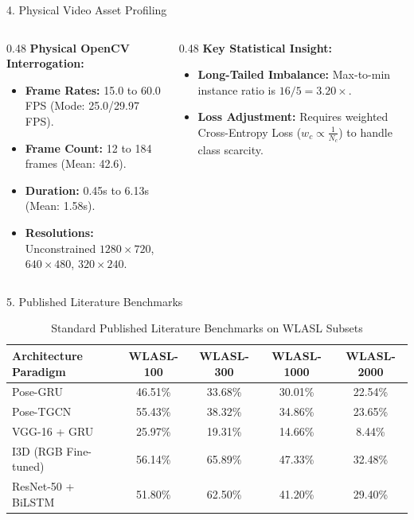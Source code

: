 \documentclass[aspectratio=169, 10pt]{beamer}
\begin{document}
\begin{frame}{4. Physical Video Asset Profiling}
  \begin{columns}[T]
    \begin{column}{0.48\textwidth}
      \textbf{Physical OpenCV Interrogation:}
      \begin{itemize}
        \item \textbf{Frame Rates:} 15.0 to 60.0 FPS (Mode: 25.0/29.97 FPS).
        \item \textbf{Frame Count:} 12 to 184 frames (Mean: 42.6).
        \item \textbf{Duration:} 0.45s to 6.13s (Mean: 1.58s).
        \item \textbf{Resolutions:} Unconstrained $1280\times720$, $640\times480$, $320\times240$.
      \end{itemize}
    \end{column}
    \begin{column}{0.48\textwidth}
      \textbf{Key Statistical Insight:}
      \begin{itemize}
        \item \textbf{Long-Tailed Imbalance:} Max-to-min instance ratio is $16 / 5 = 3.20\times$.
        \item \textbf{Loss Adjustment:} Requires weighted Cross-Entropy Loss ($w_c \propto \frac{1}{N_c}$) to handle class scarcity.
      \end{itemize}
    \end{column}
  \end{columns}
\end{frame}

\begin{frame}{5. Published Literature Benchmarks}
  \begin{table}
    \centering
    \caption{Standard Published Literature Benchmarks on WLASL Subsets}
    \small
    \begin{tabular}{lcccc}
      \toprule
      \textbf{Architecture Paradigm} & \textbf{WLASL-100} & \textbf{WLASL-300} & \textbf{WLASL-1000} & \textbf{WLASL-2000} \\
      \midrule
      Pose-GRU & 46.51\% & 33.68\% & 30.01\% & 22.54\% \\
      Pose-TGCN & 55.43\% & 38.32\% & 34.86\% & 23.65\% \\
      VGG-16 + GRU & 25.97\% & 19.31\% & 14.66\% & 8.44\% \\
      I3D (RGB Fine-tuned) & 56.14\% & 65.89\% & 47.33\% & 32.48\% \\
      ResNet-50 + BiLSTM & 51.80\% & 62.50\% & 41.20\% & 29.40\% \\
      \bottomrule
    \end{tabular}
  \end{table}
\end{frame}
\end{document}
